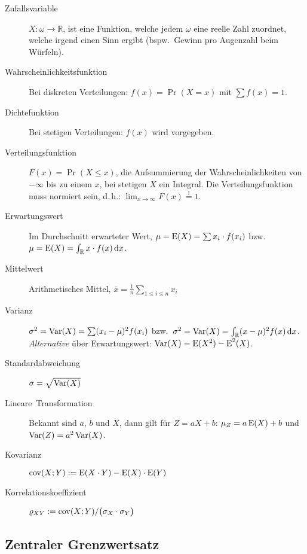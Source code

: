 \begin{description}
  \item [{Zufallsvariable}] 
	$X:\omega\to\mathbb{R}$, ist eine Funktion, welche jedem $\omega$ eine reelle Zahl zuordnet, welche irgend einen Sinn ergibt (bspw.~Gewinn pro Augenzahl beim Würfeln).
  \item [{Wahrscheinlichkeitsfunktion}] 
	Bei diskreten Verteilungen: $f(x)=\Pr(X=x)$ mit $\sum f(x)=1$.
  \item [{Dichtefunktion}] 
	Bei stetigen Verteilungen: $f(x)$ wird vorgegeben.
  \item [{Verteilungsfunktion}] 
	$F(x)=\Pr(X\leq x)$, die Aufsummierung der Wahrscheinlichkeiten von $-\infty$ bis zu einem $x$, bei stetigen $X$ ein Integral.
	Die Verteilungsfunktion muss normiert sein, d.\,h.: $\lim_{x\to\infty} F(x) \stackrel{!}{=} 1$.
  \item [{Erwartungswert}] 
	Im Durchschnitt erwarteter Wert, $\mu = \operatorname{E}(X) = \sum x_{i} \cdot f(x_{i})$ bzw.~$\mu = \operatorname{E}(X) = \int_\mathbb{R} x \cdot f(x)\,\mathrm{d} x$.
  \item [{Mittelwert}] 
	Arithmetisches Mittel, $\bar{x} = \frac{1}{n} \sum_{1 \leq i \leq n} x_i$
  \item [{Varianz}] 
	$\sigma^{2}=\operatorname{Var}(X)=\sum(x_{i}-\mu)^{2}f(x_{i})$ bzw.~$\sigma^{2}=\operatorname{Var}(X)=\int_\mathbb{R} (x-\mu)^{2}f(x)\,\mathrm{d} x$.
	\emph{Alternative} über Erwartungswert: $\operatorname{Var}(X)=\operatorname{E}(X^{2})-\operatorname{E}^2(X)$.
  \item [{Standardabweichung}] 
	$\sigma=\sqrt{\operatorname{Var}(X)}$
  \item [{Lineare~Transformation}] 
	Bekannt sind $a$, $b$ und $X$, dann gilt für $Z=aX+b$:
	$\mu_{Z}=a\operatorname{E}(X)+b$ und $\operatorname{Var}(Z)=a^{2}\operatorname{Var}(X)$.
  \item [{Kovarianz}] 
	$\operatorname{cov}(X;Y):=\operatorname{E}(X\cdot Y)-\operatorname{E}(X)\cdot \operatorname{E}(Y)$
  \item [{Korrelationskoeffizient}] 
	$\varrho_{XY} := \operatorname{cov}(X;Y) / \bigl( \sigma_X \cdot \sigma_Y \bigr)$
\end{description}



\subsection{Zentraler Grenzwertsatz}

